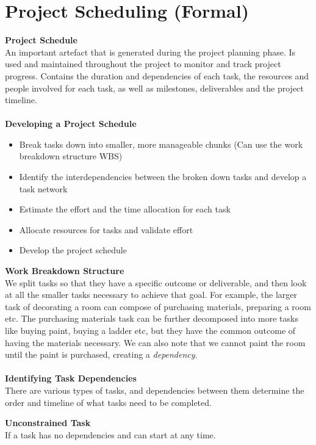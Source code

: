 \documentclass[a4paper,10pt]{article}
\begin{document}
\section*{Project Scheduling (Formal)}
\textcolor{BlueGreen}{\textbf{Project Schedule}} \\
An important artefact that is generated during the project planning phase. Is used and maintained throughout the project to monitor and track project progress. Contains the duration and dependencies of each task, the resources and people involved for each task, as well as milestones, deliverables and the project timeline. \\\\
\textcolor{BlueGreen}{\textbf{Developing a Project Schedule}}
\begin{itemize}
	\item Break tasks down into smaller, more manageable chunks (Can use the work breakdown structure WBS)
	\item Identify the interdependencies between the broken down tasks and develop a task network 
	\item Estimate the effort and the time allocation for each task 
	\item Allocate resources for tasks and validate effort 
	\item Develop the project schedule
\end{itemize}
\textcolor{BlueGreen}{\textbf{Work Breakdown Structure}} \\
We split tasks so that they have a specific outcome or deliverable, and then look at all the  smaller tasks necessary to achieve that goal. For example, the larger task of decorating a room can compose of purchasing materials, preparing a room etc. The purchasing materials task can be further decomposed into more tasks like buying paint, buying a ladder etc, but they have the common outcome of having the materials necessary. We can also note that we cannot paint the room until the paint is purchased, creating a \emph{dependency}. \\\\
\textcolor{BlueGreen}{\textbf{Identifying Task Dependencies}} \\
There are various types of tasks, and dependencies between them determine the order and timeline of what tasks need to be completed. 
\begin{shaded}
	\noindent \textcolor{Emerald}{\textbf{Unconstrained Task}} \\
	If a task has no dependencies and can start at any time. 
\end{shaded}
\end{document}
